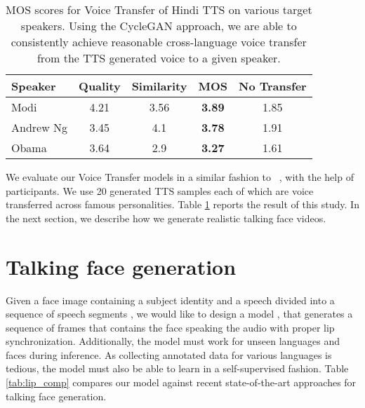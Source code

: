 \documentclass[sigconf]{acmart}
\begin{document}
\begin{table}[h]
  \begin{tabular}{l|cc|cc}
    \hline
    Speaker & Quality & Similarity & MOS & No Transfer\\
    \hline
    Modi & 4.21 & 3.56 & \textbf{3.89} & 1.85\\
    Andrew Ng & 3.45 & 4.1 & \textbf{3.78} & 1.91 \\
    Obama & 3.64 & 2.9 & \textbf{3.27} & 1.61\\
  \hline
\end{tabular}
\caption{MOS scores for Voice Transfer of Hindi TTS on various target speakers. Using the CycleGAN approach, we are able to consistently achieve reasonable cross-language voice transfer from the TTS generated voice to a given speaker.}
\label{tab:voicemos}
\vspace{-0.7cm}
\end{table}

We evaluate our Voice Transfer models in a similar fashion to ~\citet{kaneko2017parallel}, with the help of  participants. We use 20 generated TTS samples each of which are voice transferred across  famous personalities. Table \ref{tab:voicemos} reports the result of this study. In the next section, we describe how we generate realistic talking face videos.

\section{Talking face generation}
\label{section:lipgan}
Given a face image  containing a subject identity and a speech  divided into a sequence of speech segments  , we would like to design a model , that generates a sequence of frames  that contains the face speaking the audio  with proper lip synchronization. Additionally, the model must work for unseen languages and faces during inference. As collecting annotated data for various languages is tedious, the model must also be able to learn in a self-supervised fashion. Table \ref{tab:lip_comp} compares our model against recent state-of-the-art approaches for talking face generation. 
\end{document}
